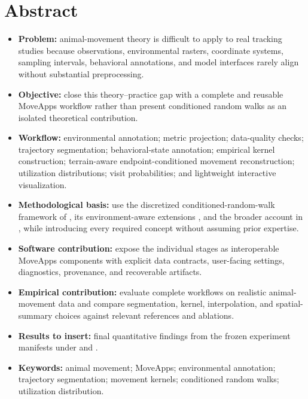 \chapter*{Abstract}

\begin{itemize}
  \item \textbf{Problem:} animal-movement theory is difficult to apply to real tracking studies because observations, environmental rasters, coordinate systems, sampling intervals, behavioral annotations, and model interfaces rarely align without substantial preprocessing.
  \item \textbf{Objective:} close this theory--practice gap with a complete and reusable MoveApps workflow rather than present conditioned random walks as an isolated theoretical contribution.
  \item \textbf{Workflow:} environmental annotation; metric projection; data-quality checks; trajectory segmentation; behavioral-state annotation; empirical kernel construction; terrain-aware endpoint-conditioned movement reconstruction; utilization distributions; visit probabilities; and lightweight interactive visualization.
  \item \textbf{Methodological basis:} use the discretized conditioned-random-walk framework of \textcite{buchin2024randomwalks}, its environment-aware extensions \parencite{buchin2026advanced}, and the broader account in \textcite{hagedoornPhD}, while introducing every required concept without assuming prior expertise.
  \item \textbf{Software contribution:} expose the individual stages as interoperable MoveApps components with explicit data contracts, user-facing settings, diagnostics, provenance, and recoverable artifacts.
  \item \textbf{Empirical contribution:} evaluate complete workflows on realistic animal-movement data and compare segmentation, kernel, interpolation, and spatial-summary choices against relevant references and ablations.
  \item \textbf{Results to insert:} final quantitative findings from the frozen experiment manifests under  and .
\end{itemize}

\begin{itemize}
  \item \textbf{Keywords:} animal movement; MoveApps; environmental annotation; trajectory segmentation; movement kernels; conditioned random walks; utilization distribution.
\end{itemize}

\cleardoublepage
